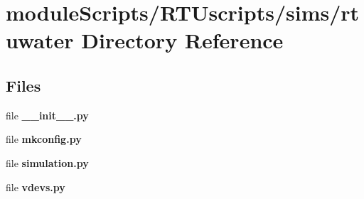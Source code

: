 \section{module\+Scripts/\+R\+T\+Uscripts/sims/rtuwater Directory Reference}
\label{dir_087c6103d4fe5e4c70a4d0401363e9bc}
\subsection*{Files}
\begin{DoxyCompactItemize}
\item 
file {\bf \+\_\+\+\_\+init\+\_\+\+\_\+.\+py}
\item 
file {\bf mkconfig.\+py}
\item 
file {\bf simulation.\+py}
\item 
file {\bf vdevs.\+py}
\end{DoxyCompactItemize}
